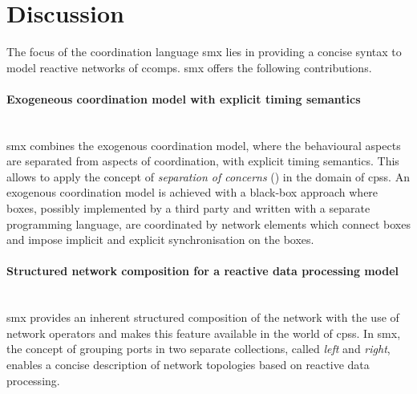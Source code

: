 \section{Discussion}
\label{sect_smx_conclusion}
The focus of the coordination language \gls*{smx} lies in providing a concise syntax to model reactive networks of \glspl*{ccomp}.
\Gls*{smx} offers the following contributions.

\paragraph*{Exogeneous coordination model with explicit timing semantics} \hfill \\
\Gls*{smx} combines the exogenous coordination model, where the behavioural aspects are separated from aspects of coordination, with explicit timing semantics.
This allows to apply the concept of \emph{separation of concerns} (\cite{arbab1998}) in the domain of \glspl{cps}.
An exogenous coordination model is achieved with a black-box approach where boxes, possibly implemented by a third party and written with a separate programming language, are coordinated by network elements which connect boxes and impose implicit and explicit synchronisation on the boxes.%

\paragraph*{Structured network composition for a reactive data processing model} \hfill \\
\Gls*{smx} provides an inherent structured composition of the network with the use of network operators and makes this feature available in the world of \glspl{cps}.
In \gls*{smx}, the concept of grouping ports in two separate collections, called \emph{left} and \emph{right}, enables a concise description of network topologies based on reactive data processing.

